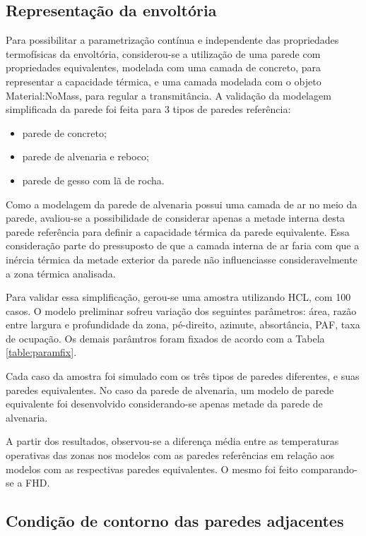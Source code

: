 \documentclass[brazil,hardcopy,openany,a5paper]{ufscthesis}
\begin{document}
		\subsection{Representação da envoltória}
		
		Para possibilitar a parametrização contínua e independente das propriedades termofísicas da envoltória, considerou-se a utilização de uma parede com propriedades equivalentes, modelada com uma camada de concreto, para representar a capacidade térmica, e uma camada modelada com o objeto Material:NoMass, para regular a transmitância.
		A validação da modelagem simplificada da parede foi feita para 3 tipos de paredes referência:
		
		\begin{itemize}
			\item parede de concreto;
			\item parede de alvenaria e reboco;
			\item parede de gesso com lã de rocha.
		\end{itemize}
		
		Como a modelagem da parede de alvenaria possui uma camada de ar no meio da parede, avaliou-se a possibilidade de considerar apenas a metade interna desta parede referência para definir a capacidade térmica da parede equivalente. Essa consideração parte do pressuposto de que a camada interna de ar faria com que a inércia térmica da metade exterior da parede não influenciasse consideravelmente a zona térmica analisada.
		
		Para validar essa simplificação, gerou-se uma amostra utilizando HCL, com 100 casos. O modelo preliminar sofreu variação dos seguintes parâmetros: área, razão entre largura e profundidade da zona, pé-direito, azimute, absortância, PAF, taxa de ocupação. Os demais parâmtros foram fixados de acordo com a Tabela \ref{table:paramfix}.
		
		Cada caso da amostra foi simulado com os três tipos de paredes diferentes, e suas paredes equivalentes. No caso da parede de alvenaria, um modelo de parede equivalente foi desenvolvido considerando-se apenas metade da parede de alvenaria.
		
		A partir dos resultados, observou-se a diferença média entre as temperaturas operativas das zonas nos modelos com as paredes referências em relação aos modelos com as respectivas paredes equivalentes. O mesmo foi feito comparando-se a FHD.
		
		\subsection{Condição de contorno das paredes adjacentes}
		
\end{document}
